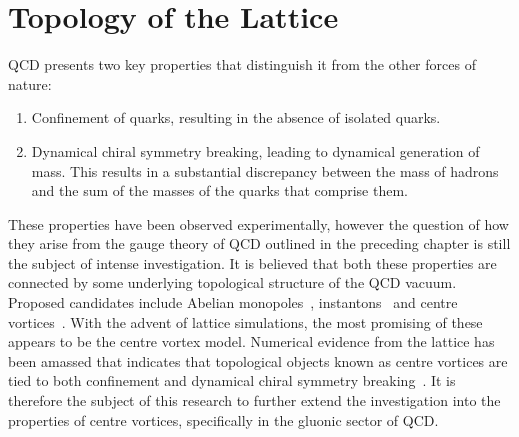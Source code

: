 \chapter{Topology of the Lattice}\label{chapter:Topology}

\ifpdf
    \graphicspath{{Chapter3/Figs/Raster/}{Chapter3/Figs/PDF/}{Chapter3/Figs/}}
\else
    \graphicspath{{Chapter3/Figs/Vector/}{Chapter3/Figs/}}
\fi
QCD presents two key properties that distinguish it from the other forces of nature:
\begin{enumerate}
\item Confinement of quarks, resulting in the absence of isolated quarks.
\item Dynamical chiral symmetry breaking, leading to dynamical generation of mass. This results in a substantial discrepancy between the mass of hadrons and the sum of the masses of the quarks that comprise them.
\end{enumerate}
These properties have been observed experimentally, however the question of how they arise from the gauge theory of QCD outlined in the preceding chapter is still the subject of intense investigation. It is believed that both these properties are connected by some underlying topological structure of the QCD vacuum. Proposed candidates include Abelian monopoles~\cite{tHooft:1981bkw,Smit:1989vg,Matsubara:1993nq,Suzuki:1989gp,Mandelstam:1974pi,Kronfeld:1987ri,Ivanenko:1990xu, Chernodub:1995tt}, instantons~\cite{Belavin:1975fg,Witten:1978bc,Callan:1977gz,Schafer:1996wv,Trewartha:2013qga,Aharonov:1978jd} and centre vortices~\cite{'tHooft:1977hy,'tHooft:1979uj,Feynman:1981ss,Aharonov:1978jd,Cornwall:1979hz,Nielsen:1979xu,Mack:1978rq}. With the advent of lattice simulations, the most promising of these appears to be the centre vortex model. Numerical evidence from the lattice has been amassed that indicates that topological objects known as centre vortices are tied to both confinement and dynamical chiral symmetry breaking~\cite{Biddle:2018dtc,Faber:1997rp,Langfeld:1998cz,Bowman:2008qd,Trewartha:2015ida,Trewartha:2015nna,Trewartha:2017ive,DelDebbio:1996lih,Greensite:2003bk,DelDebbio:1998luz,OMalley:2011aa,Langfeld:2003ev,Bowman:2010zr}. It is therefore the subject of this research to further extend the investigation into the properties of centre vortices, specifically in the gluonic sector of QCD.\\

